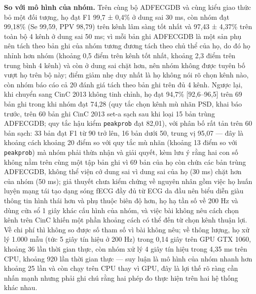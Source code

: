 \documentclass[12pt,a4paper]{article}
\begin{document}
\noindent \textbf{\color{tdtblue}So với mô hình của nhóm.} Trên cùng bộ ADFECGDB và cùng kiểu giao thức bỏ một đối tượng, họ đạt F1 99,7 ± 0,4\% ở dung sai 30 ms, còn nhóm đạt 99,18\% (Se 99,59, PPV 98,79) trên kênh lâm sàng tốt nhất và 97,43 ± 4,37\% trên toàn bộ 4 kênh ở dung sai 50 ms; vì mỗi bản ghi ADFECGDB là một sản phụ nên tách theo bản ghi của nhóm tương đương tách theo chủ thể của họ, do đó họ nhỉnh hơn nhóm (khoảng 0,5 điểm trên kênh tốt nhất, khoảng 2,3 điểm trên trung bình 4 kênh) và còn ở dung sai chặt hơn, nên nhóm không được tuyên bố vượt họ trên bộ này; điểm giảm nhẹ duy nhất là họ không nói rõ chọn kênh nào, còn nhóm báo cáo cả 20 đánh giá tách theo bản ghi trên đủ 4 kênh. Ngược lại, khi chuyển sang CinC 2013 không tinh chỉnh, họ đạt 94,7\% [92,6–96,5] trên 69 bản ghi trong khi nhóm đạt 74,28 (quy tắc chọn kênh mù nhãn PSD, khai báo trước, trên 60 bản ghi CinC 2013 set-a sạch sau khi loại 15 bản trùng ADFECGDB; quy tắc hậu kiểm \texttt{peakprob} đạt 82,01), với phân bố rất tản trên 60 bản sạch: 33 bản đạt F1 từ 90 trở lên, 16 bản dưới 50, trung vị 95,07 — đây là khoảng cách khoảng 20 điểm so với quy tắc mù nhãn (khoảng 13 điểm so với \texttt{peakprob}) mà nhóm phải thừa nhận và giải quyết, kèm lưu ý rằng hai con số không nằm trên cùng một tập bản ghi vì 69 bản của họ còn chứa các bản trùng ADFECGDB, không thể viện cớ dung sai vì dung sai của họ (30 ms) chặt hơn của nhóm (50 ms); giả thuyết chưa kiểm chứng về nguyên nhân gồm việc họ huấn luyện mạng tái tạo dạng sóng fECG đầy đủ từ ECG da đầu nên biểu diễn giàu thông tin hình thái hơn và phụ thuộc biên độ hơn, họ hạ tần số về 200 Hz và dùng cửa sổ 1 giây khác cấu hình của nhóm, và việc bài không nêu cách chọn kênh trên CinC khiến một phần khoảng cách có thể đến từ chọn kênh thuận lợi. Về chi phí thì không so được số tham số vì bài không nêu; về thông lượng, họ xử lý 1.000 mẫu (tức 5 giây tín hiệu ở 200 Hz) trong 0,14 giây trên GPU GTX 1060, khoảng 36 lần thời gian thực, còn nhóm xử lý 4 giây tín hiệu trong 4,35 ms trên CPU, khoảng 920 lần thời gian thực — suy luận là mô hình của nhóm nhanh hơn khoảng 25 lần và còn chạy trên CPU thay vì GPU, đây là lợi thế rõ ràng cần nhấn mạnh nhưng phải ghi chú rằng hai phép đo thực hiện trên hai hệ thống khác nhau.\par\vspace{3pt}
\end{document}
